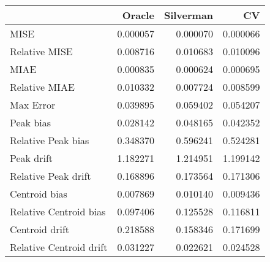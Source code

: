 \begin{tabular}{lrrr}
  \hline
 & Oracle & Silverman & CV \\ 
  \hline
MISE & 0.000057 & 0.000070 & 0.000066 \\ 
  Relative MISE & 0.008716 & 0.010683 & 0.010096 \\ 
  MIAE & 0.000835 & 0.000624 & 0.000695 \\ 
  Relative MIAE & 0.010332 & 0.007724 & 0.008599 \\ 
  Max Error & 0.039895 & 0.059402 & 0.054207 \\ 
  Peak bias & 0.028142 & 0.048165 & 0.042352 \\ 
  Relative Peak bias & 0.348370 & 0.596241 & 0.524281 \\ 
  Peak drift & 1.182271 & 1.214951 & 1.199142 \\ 
  Relative Peak drift & 0.168896 & 0.173564 & 0.171306 \\ 
  Centroid bias & 0.007869 & 0.010140 & 0.009436 \\ 
  Relative Centroid bias & 0.097406 & 0.125528 & 0.116811 \\ 
  Centroid drift & 0.218588 & 0.158346 & 0.171699 \\ 
  Relative Centroid drift & 0.031227 & 0.022621 & 0.024528 \\ 
   \hline
\end{tabular}
